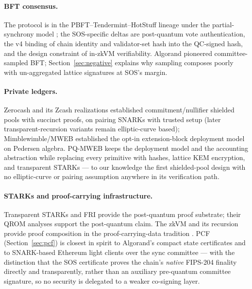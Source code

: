 \documentclass[11pt]{article}
\theoremstyle{plain}
\theoremstyle{definition}
\theoremstyle{remark}
\begin{document}
\paragraph{BFT consensus.} The protocol is in the
PBFT--Tendermint--HotStuff lineage
\cite{pbft1999,tendermint2016,tendermint2018,hotstuff2019} under the
partial-synchrony model \cite{dls1988,flp1985}; the SOS-specific deltas are
post-quantum vote authentication, the v4 binding of chain identity and
validator-set hash into the QC-signed hash, and the design constraint of
in-zkVM verifiability. Algorand \cite{algorand2017} pioneered
committee-sampled BFT; Section~\ref{sec:negative} explains why sampling
composes poorly with un-aggregated lattice signatures at SOS's margin.

\paragraph{Private ledgers.} Zerocash \cite{zerocash2014} and its Zcash
realizations \cite{zcashspec} established commitment/nullifier shielded
pools with succinct proofs, on pairing SNARKs with trusted setup (later
transparent-recursion variants remain elliptic-curve based);
Mimblewimble/MWEB \cite{mimblewimble2016,poelstra2016,mweb2020} established
the opt-in extension-block deployment model on Pedersen algebra. PQ-MWEB
keeps the deployment model and the accounting abstraction while replacing
every primitive with hashes, lattice KEM encryption, and transparent
STARKs --- to our knowledge the first shielded-pool design with no
elliptic-curve or pairing assumption anywhere in its verification path.

\paragraph{STARKs and proof-carrying infrastructure.} Transparent STARKs
and FRI \cite{starks2018,fri2018,bcs2016,ethstark2021} provide the
post-quantum proof substrate; their QROM analyses \cite{cms2019} support
the post-quantum claim. The zkVM and its recursion
\cite{risc0} provide proof composition in the proof-carrying-data tradition
\cite{pcd2010}. PCF (Section~\ref{sec:pcf}) is closest in spirit to
Algorand's compact state certificates \cite{compactcerts2020} and to
SNARK-based Ethereum light clients over the sync committee
\cite{succinct2022,altair2021,popos2022} --- with the distinction that the
SOS certificate proves the chain's \emph{native} FIPS-204 finality directly
and transparently, rather than an auxiliary pre-quantum committee
signature, so no security is delegated to a weaker co-signing layer.
\end{document}
